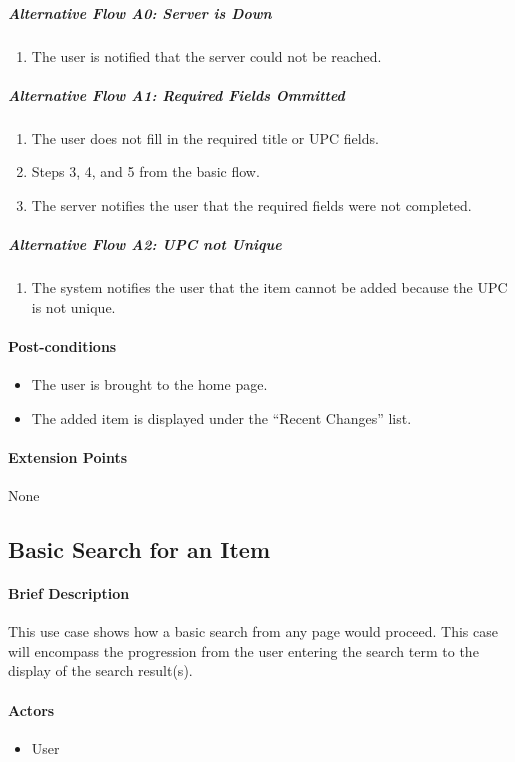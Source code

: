 \documentclass{article}
\begin{document}
\subparagraph{Alternative Flow A0: Server is Down}
\begin{enumerate}
\item The user is notified that the server could not be reached.
\end{enumerate}
\subparagraph{Alternative Flow A1: Required Fields Ommitted}
\begin{enumerate}
\item The user does not fill in the required title or UPC fields.
\item Steps 3, 4, and 5 from the basic flow.
\item The server notifies the user that the required fields were not completed.
\end{enumerate}
\subparagraph{Alternative Flow A2: UPC not Unique}
\begin{enumerate}
\item The system notifies the user that the item cannot be added because the UPC is not unique.
\end{enumerate}

\paragraph{Post-conditions}
\begin{itemize}
\item The user is brought to the home page.
\item The added item is displayed under the ``Recent Changes'' list.
\end{itemize}

\paragraph{Extension Points}
None

\subsection{Basic Search for an Item}

\paragraph{Brief Description}
This use case shows how a basic search from any page  would proceed. This case will encompass the progression from the user entering the search term to the display of the search result(s).

\paragraph{Actors}
\begin{itemize}
\item User
\end{itemize}
\end{document}
